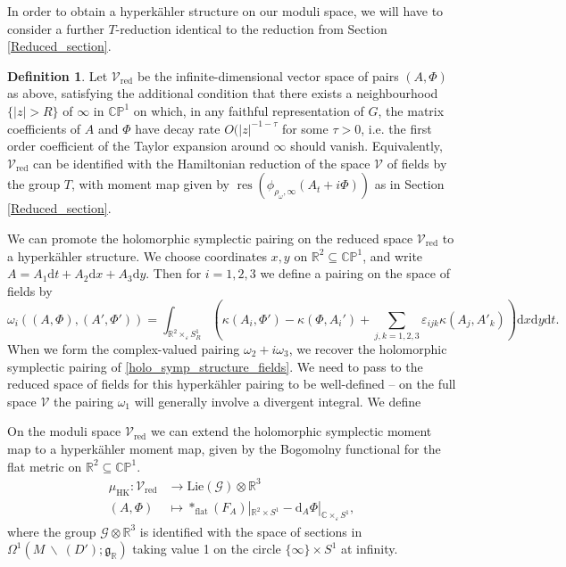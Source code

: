 \documentclass[11pt, oneside, reqno]{amsart}
\theoremstyle{definition} \newtheorem{definition}{Definition}[section]
\theoremstyle{definition} \newtheorem{remark}[definition]{Remark}
\theoremstyle{definition} \newtheorem{remarks}[definition]{Remarks}
\theoremstyle{definition} \newtheorem{question}[definition]{Question}
\theoremstyle{definition} \newtheorem*{note}{Note}
\theoremstyle{definition} \newtheorem{example}[definition]{Example}
\theoremstyle{definition} \newtheorem{examples}[definition]{Examples}
\renewcommand{\gg}{\mathfrak{g}}
\newcommand{\bb}[1]{\mathbb{#1}}
\newcommand{\mr}[1]{\mathrm{#1}}
\newcommand{\mc}[1]{\mathcal{#1}}
\newcommand{\bs}{\ \backslash \ }
\newcommand{\CC}{\mathbb{C}}
\newcommand{\RR}{\mathbb{R}}
\newcommand{\eps}{\varepsilon}
\newcommand{\sub}{\subseteq}
\DeclareMathOperator{\res}{res}
\renewcommand{\d}{\mathrm{d}}
\begin{document}
In order to obtain a hyperk\"ahler structure on our moduli space, we will have to consider a further $T$-reduction identical to the reduction from Section \ref{Reduced_section}.

\begin{definition}
  Let $\mc V_{\mr{red}}$ be the infinite-dimensional vector space of pairs $(A,\Phi)$ as above, satisfying the additional condition that there exists a neighbourhood $\{|z| > R\}$ of $\infty$ in $\bb{CP}^1$ on which, in any faithful representation of $G$, the matrix coefficients of $A$ and $\Phi$ have decay rate $O(|z|^{-1-\tau}$ for some $\tau > 0$, i.e. the first order coefficient of the Taylor expansion around $\infty$ should vanish. Equivalently, $\mc V_{\mr{red}}$ can be identified with the Hamiltonian reduction of the space $\mc V$ of fields by the group $T$, with moment map given by $\res(\phi_{\rho_\omega, \infty}(A_t + i \Phi))$ as in Section \ref{Reduced_section}.
\end{definition}

We can promote the holomorphic symplectic pairing on the reduced space $\mc V_{\mr{red}}$ to a hyperk\"ahler structure.  We choose coordinates $x,y$ on $\RR^2 \sub \bb{CP}^1$, and write $A = A_1 \d t + A_2 \d x + A_3 \d y$.  Then for $i=1,2,3$ we define a pairing on the space of fields by
\begin{equation}
\label{hyperkahler_structure_fields}
\omega_i((A,\Phi),(A',\Phi')) = \int_{\RR^2 \times_\eps S^1_R} \left(\kappa(A_i,\Phi') - \kappa(\Phi, A_i') + \sum_{j,k=1,2,3} \eps_{ijk} \kappa(A_j,A'_k)\right) \d x \d y \d t.
\end{equation}
When we form the complex-valued pairing $\omega_2 + i \omega_3$, we recover the holomorphic symplectic pairing of \ref{holo_symp_structure_fields}.  We need to pass to the reduced space of fields for this hyperk\"ahler pairing to be well-defined -- on the full space $\mc V$ the pairing $\omega_1$ will generally involve a divergent integral.  We define 

On the moduli space $\mc V_{\mr{red}}$ we can extend the holomorphic symplectic moment map to a hyperk\"ahler moment map, given by the Bogomolny functional for the flat metric on $\RR^2 \sub \bb{CP}^1$.  
\begin{align}
\mu_{\mr{HK}} \colon \mc V_{\mr{red}} &\to \mr{Lie}(\mc G) \otimes \RR^3 \\
(A,\Phi) &\mapsto \ast_{\mr{flat}} (F_A)|_{\RR^2 \times S^1}- \d_A \Phi|_{\CC \times_\eps S^1}, \nonumber
\end{align}
where the group $\mc G \otimes \RR^3$ is identified with the space of sections in $\Omega^1(M \bs (D'); \gg_\RR)$ taking value 1 on the circle $\{\infty\} \times S^1$ at infinity.
\end{document}
